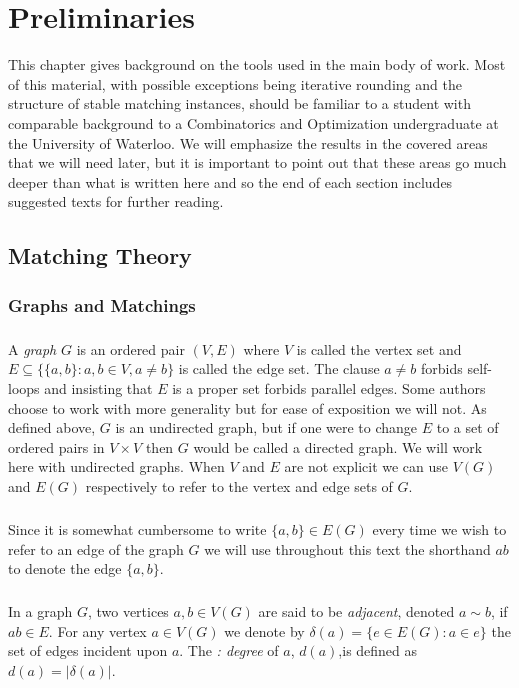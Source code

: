 \chapter{Preliminaries}
This chapter gives background on the tools used in the main body of work. Most of this material, with possible exceptions being iterative rounding and the structure of stable matching instances, should be familiar to a student with comparable background to a Combinatorics and Optimization undergraduate at the University of Waterloo. We will emphasize the results in the covered areas that we will need later, but it is important to point out that these areas go much deeper than what is written here and so the end of each section includes suggested texts for further reading.

\section{Matching Theory}
\subsection{Graphs and Matchings}
\paragraph{}
 A {\it graph} $G$ is an ordered pair $(V,E)$ where $V$ is called the vertex set and $E \subseteq \{\{a,b\} : a,b \in V, a \neq b\}$ is called the edge set. The clause $a \neq b$ forbids self-loops and insisting that $E$ is a proper set forbids parallel edges. Some authors choose to work with more generality but for ease of exposition we will not. As defined above, $G$ is an undirected graph, but if one were to change $E$ to a set of ordered pairs in $V \times V$ then $G$ would be called a directed graph. We will work here with undirected graphs. When $V$ and $E$ are not explicit we can use $V(G)$ and $E(G)$ respectively to refer to the vertex and edge sets of $G$.
\paragraph{}
Since it is somewhat cumbersome to write $\{a,b\} \in E(G)$ every time we wish to refer to an edge of the graph $G$ we will use throughout this text the shorthand $ab$ to denote the edge $\{a,b\}$.
\paragraph{} In a graph $G$, two vertices $a,b \in V(G)$ are said to be {\it adjacent}, denoted $a \sim b$, if $ab \in E$. For any vertex $a \in V(G)$ we denote by $\delta(a) = \{e \in E(G): a\in e\}$ the set of edges incident upon $a$. The {\it: degree} of $a$, $d(a)$,is defined as $d(a) = |\delta(a)|$.

